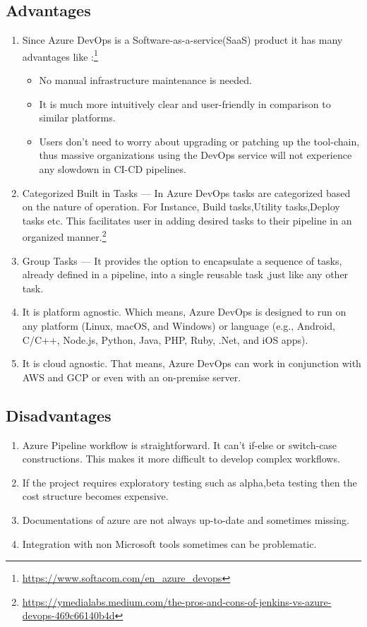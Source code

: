 \subsection{Advantages}
%
\begin{enumerate}
   \item Since Azure DevOps is a Software-as-a-service(SaaS) product it has many advantages like :\footnote{\url{https://www.softacom.com/en_azure_devops}}
   \begin{itemize}
     \item No manual infrastructure maintenance is needed. 
     \item It is much more intuitively clear and user-friendly in comparison to similar platforms.
     \item Users don’t need to worry about upgrading or patching up the tool-chain, thus massive organizations using the DevOps service will not experience any slowdown in CI-CD pipelines.
   \end{itemize}
   \item Categorized Built in Tasks — In Azure DevOps tasks are categorized based on the nature of operation. For Instance, Build tasks,Utility tasks,Deploy tasks etc. This facilitates user in adding desired tasks to their pipeline in an organized manner.\footnote{\url{https://ymedialabs.medium.com/the-pros-and-cons-of-jenkins-vs-azure-devops-469c66140b4d}}
   \item Group Tasks — It provides the option to encapsulate a sequence of tasks, already defined in a pipeline, into a single reusable task ,just like any other task.
   \item  It is platform agnostic. Which means, Azure DevOps is designed to run on any platform (Linux, macOS, and Windows) or language (e.g., Android, C/C++, Node.js, Python, Java, PHP, Ruby, .Net, and iOS apps).
   \item It is cloud agnostic. That means, Azure DevOps can  work in conjunction with AWS and GCP or even with an on-premise server. 
\end{enumerate}
%

\subsection{Disadvantages}
%
\begin{enumerate}
    \item Azure Pipeline workflow is straightforward. It can’t if-else or switch-case constructions. This makes it more difficult to develop complex workflows.
    \item If the project requires exploratory testing such as alpha,beta testing then the cost structure becomes expensive. 
    \item Documentations of azure are not always up-to-date and sometimes missing.
    \item Integration with non Microsoft tools sometimes can be problematic. 
\end{enumerate}
%

